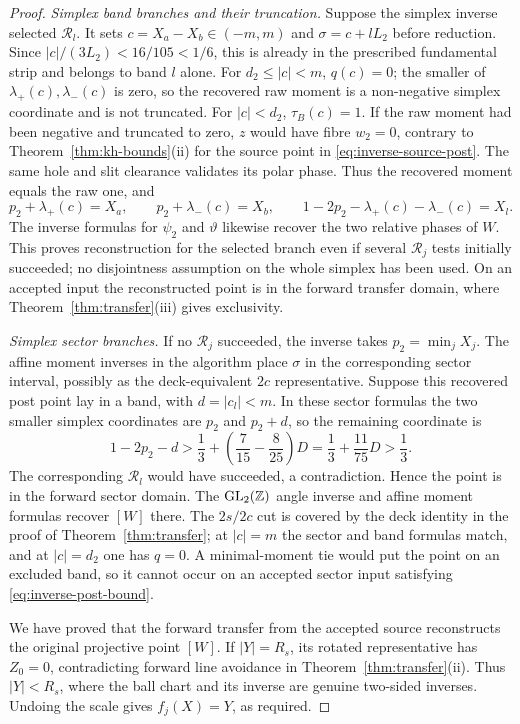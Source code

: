 \begin{proof}
\emph{Simplex band branches and their truncation.} Suppose the simplex inverse selected $\mathcal R_l$.
It sets $c=X_a-X_b\in(-m,m)$ and $\sigma=c+lL_2$ before reduction. Since
$|c|/(3L_2)<16/105<1/6$, this is already in the prescribed fundamental strip and belongs to band $l$ alone.
For $d_2\le|c|<m$, $q(c)=0$; the smaller of $\lambda_+(c),\lambda_-(c)$ is zero, so the recovered raw moment
is a non-negative simplex coordinate and is not truncated. For $|c|<d_2$, $\tau_B(c)=1$.
If the raw moment had been negative and truncated to zero, $z$ would have fibre $w_2=0$, contrary to
Theorem~\ref{thm:kh-bounds}(ii) for the source point in \eqref{eq:inverse-source-post}.
The same hole and slit clearance validates its polar phase. Thus the recovered moment equals the raw one, and
\[
 p_2+\lambda_+(c)=X_a,\qquad p_2+\lambda_-(c)=X_b,\qquad
 1-2p_2-\lambda_+(c)-\lambda_-(c)=X_l.
\]
The inverse formulas for $\psi_2$ and $\vartheta$ likewise recover the two relative phases of $W$.
This proves reconstruction for the selected branch even if several $\mathcal R_j$ tests initially succeeded;
no disjointness assumption on the whole simplex has been used. On an accepted input the reconstructed point
is in the forward transfer domain, where Theorem~\ref{thm:transfer}(iii) gives exclusivity.

\emph{Simplex sector branches.} If no $\mathcal R_j$ succeeded, the inverse takes $p_2=\min_j X_j$.
The affine moment inverses in the algorithm place $\sigma$ in the corresponding sector interval, possibly as the
deck-equivalent $2c$ representative. Suppose this recovered post point lay in a band, with
$d=|c_l|<m$. In these sector formulas the two smaller simplex coordinates are $p_2$ and $p_2+d$, so the remaining
coordinate is
\[
 1-2p_2-d>\frac13+\left(\frac7{15}-\frac8{25}\right)D
 =\frac13+\frac{11}{75}D>\frac13.
\]
The corresponding $\mathcal R_l$ would have succeeded, a contradiction. Hence the point is in the forward sector
domain. The $\mathrm{GL}_2(\mathbb{Z})$ angle inverse and affine moment formulas recover $[W]$ there.
The $2s/2c$ cut is covered by the deck identity in the proof of Theorem~\ref{thm:transfer}; at $|c|=m$ the sector
and band formulas match, and at $|c|=d_2$ one has $q=0$. A minimal-moment tie would put the point on an excluded
band, so it cannot occur on an accepted sector input satisfying \eqref{eq:inverse-post-bound}.

We have proved that the forward transfer from the accepted source reconstructs the original projective point $[W]$.
If $|Y|=R_s$, its rotated representative has $Z_0=0$, contradicting forward line avoidance in
Theorem~\ref{thm:transfer}(ii). Thus $|Y|<R_s$, where the ball chart and its inverse are genuine two-sided inverses.
Undoing the scale gives $f_j(X)=Y$, as required.
\end{proof}

